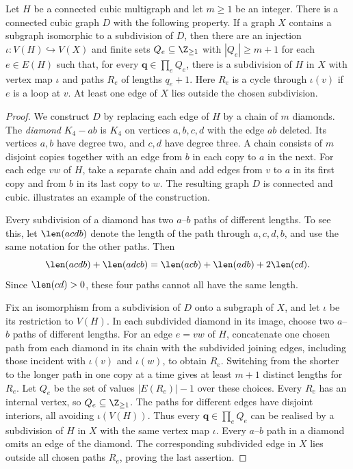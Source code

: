 \begin{lemma}\label{lem:independent-path-lengths}
 Let $H$ be a connected cubic multigraph and let $m\geq1$ be an integer.
 There is a connected cubic graph $D$ with the following property.
 If a graph $X$ contains a subgraph isomorphic to a subdivision of $D$,
 then there are an injection $\iota:V(H)\hookrightarrow V(X)$ and finite
 sets $Q_e\subseteq\Z_{\geq1}$ with $|Q_e|\geq m+1$ for each $e\in E(H)$
 such that, for every $\mathbf q\in\prod_eQ_e$, there is a subdivision
 of $H$ in $X$ with vertex map $\iota$ and paths $R_e$ of lengths $q_e+1$.
 Here $R_e$ is a cycle through $\iota(v)$ if $e$ is a loop at $v$.
 At least one edge of $X$ lies outside the chosen subdivision.
\end{lemma}
\begin{proof}
We construct $D$ by replacing each edge of $H$ by a chain of $m$ diamonds.
The \emph{diamond} $K_4-ab$ is $K_4$ on vertices $a,b,c,d$ with the
edge $ab$ deleted. Its vertices $a,b$ have degree two, and $c,d$ have
degree three. A chain consists of $m$ disjoint copies together with
an edge from $b$ in each copy to $a$ in the next.
For each edge $vw$ of $H$, take a separate chain and add edges from
$v$ to $a$ in its first copy and from $b$ in its last copy to $w$.
The resulting graph $D$ is connected and cubic.
 illustrates an example of the construction.


Every subdivision of a diamond has two $a$--$b$ paths of different lengths.
To see this, let $\len(acdb)$ denote the length of the path through
$a,c,d,b$, and use the same notation for the other paths. Then
\begin{equation}\label{eq:diamond-lengths}
 \len(acdb)+\len(adcb)
 =\len(acb)+\len(adb)+2\len(cd).
\end{equation}
Since $\len(cd)>0$, these four paths cannot all have the same length.

Fix an isomorphism from a subdivision of $D$ onto a subgraph of $X$,
and let $\iota$ be its restriction to $V(H)$.
In each subdivided diamond in its image, choose two $a$--$b$ paths of
different lengths. For an edge $e=vw$ of $H$, concatenate one chosen
path from each diamond in its chain with the subdivided joining edges,
including those incident with $\iota(v)$ and $\iota(w)$, to obtain $R_e$.
Switching from the shorter to the longer path in one copy at a time
gives at least $m+1$ distinct lengths for $R_e$.
Let $Q_e$ be the set of values $|E(R_e)|-1$ over these choices.
Every $R_e$ has an internal vertex, so $Q_e\subseteq\Z_{\geq1}$.
The paths for different edges have disjoint interiors, all avoiding
$\iota(V(H))$. Thus every $\mathbf q\in\prod_eQ_e$ can be realised by
a subdivision of $H$ in $X$ with the same vertex map $\iota$.
Every $a$--$b$ path in a diamond omits an edge of the diamond.
The corresponding subdivided edge in $X$ lies outside all chosen
paths $R_e$, proving the last assertion.
\end{proof}

